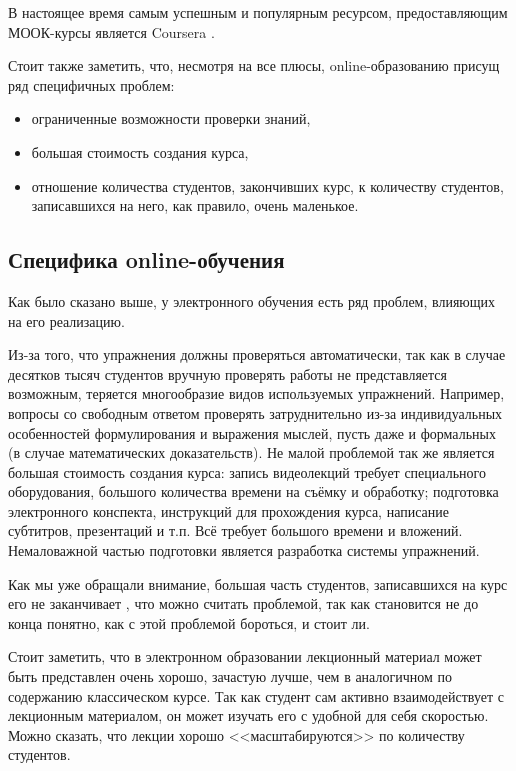 \documentclass{matmex-diploma-custom}
\begin{document}
В настоящее время самым успешным и популярным ресурсом,
предоставляющим МООК-курсы является Coursera \cite{coursera}. %

Стоит также заметить, что, несмотря на все плюсы, online-образованию
присущ ряд специфичных проблем:
\begin{itemize}
\item ограниченные возможности проверки знаний,
\item большая стоимость создания курса,
\item отношение количества студентов, закончивших курс, к количеству
  студентов, записавшихся на него, как правило, очень маленькое.
\end{itemize}

\subsection*{Специфика online-обучения}
Как было сказано выше, у электронного обучения есть ряд проблем,
влияющих на его реализацию.

Из-за того, что упражнения должны проверяться автоматически, так как в
случае десятков тысяч студентов вручную проверять работы не
представляется возможным, теряется многообразие видов используемых
упражнений. Например, вопросы со свободным ответом проверять
затруднительно из-за индивидуальных особенностей формулирования и
выражения мыслей, пусть даже и формальных (в случае математических
доказательств).  Не малой проблемой так же является большая стоимость
создания курса: запись видеолекций требует специального оборудования,
большого количества времени на съёмку и обработку; подготовка
электронного конспекта, инструкций для прохождения курса, написание
субтитров, презентаций и т.п. Всё требует большого времени и
вложений. Немаловажной частью подготовки является разработка системы
упражнений.

Как мы уже обращали внимание, большая часть студентов, записавшихся на
курс его не заканчивает \cite{Clow}, что можно считать проблемой, так
как становится не до конца понятно, как с этой проблемой бороться, и
стоит ли.

Стоит заметить, что в электронном образовании лекционный материал
может быть представлен очень хорошо, зачастую лучше, чем в аналогичном
по содержанию классическом курсе. Так как студент сам активно
взаимодействует с лекционным материалом, он может изучать его с
удобной для себя скоростью. Можно сказать, что лекции хорошо
<<масштабируются>> по количеству студентов.
\end{document}
